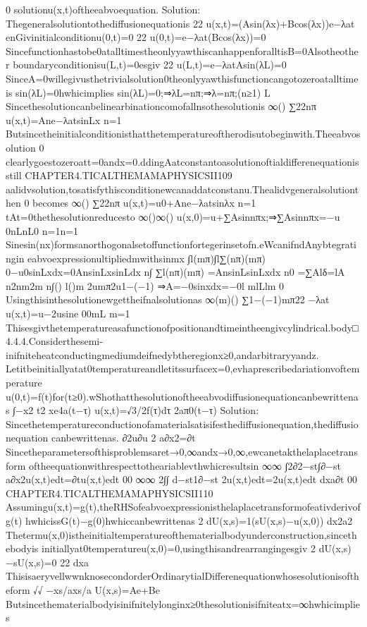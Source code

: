 {{{{0
solutionu(x,t)oftheeabvoequation.
Solution:
Thegeneralsolutiontothediffusionequationis
22
u(x,t)=(Asin(λx)+Bcos(λx))e−λat
enGivinitialconditionu(0,t)=0
22
u(0,t)=e−λat(Bcos(λx))=0
Sincefunctionhastobe0atalltimestheonlyyawthiscanhappenforalltisB=0Alsotheother
boundaryconditionisu(L,t)=0esgiv
22
u(L,t)=e−λatAsin(λL)=0
SinceA=0willegivusthetrivialsolution0theonlyyawthisfunctioncangotozeroatalltimeis
sin(λL)=0hwhicimplies
sin(λL)=0;⇒λL=nπ;⇒λ=nπ;(n≥1)
L
Sincethesolutioncanbelinearbinationcomofallnsothesolutionis
∞()
∑22nπ
u(x,t)=Ane−λatsinLx
n=1
Butsincetheinitialconditionisthatthetemperatureoftherodisutobeginwith.Theeabvosolution
0
clearlygoestozeroatt=0andx=0.ddingAatconstantoasolutionoftialdifferenequationisstill
CHAPTER4.TICALTHEMAMAPHYSICSII109
aalidvsolution,tosatisfythisconditionewcanaddatconstanu.Thealidvgeneralsolutionthen
0
becomes
∞()
∑22nπ
u(x,t)=u0+Ane−λatsinλx
n=1
tAt=0thethesolutionreducesto
∞()∞()
u(x,0)=u+∑Asinnπx;⇒∑Asinnπx=−u
0nLnL0
n=1n=1
Sinesin(nx)formsanorthogonalsetoffunctionfortegerinsetofn.eWcanifndAnybtegratingin
eabvoexpressionultipliedmwithsinmx
∫l(mπ)∫l∑(nπ)(mπ)
0−u0sinLxdx=0AnsinLxsinLdx
n∫
∑l(nπ)(mπ)
=AnsinLsinLxdx
n0
=∑Alδ=lA
n2nm2m
n∫()
l()m
2umπ2u1−(−1)
⇒A=−0sinxdx=−0l
mlLlm
0
Usingthisinthesolutionewgettheifnalsolutionas
∞(m)()
∑1−(−1)mπ22
−λat
u(x,t)=u−2usine
00mL
m=1
Thisesgivthetemperatureasafunctionofpositionandtimeintheengivcylindrical.body□
4.4.4.Considerthesemi-inifniteheatconductingmediumdeifnedybtheregionx≥0,andarbitraryyandz.
Letitbeinitiallyatat0temperatureandletitssurfacex=0,evhaprescribedariationvoftemperature
u(0,t)=f(t)for(t≥0).wShothatthesolutionoftheeabvodiffusionequationcanbewrittenas
∫−x2
t2
xe4a(t−τ)
u(x,t)=√3/2f(τ)dτ
2aπ0(t−τ)
Solution:
Sincethetemperatureconductionofamaterialsatisifesthediffusionequation,thediffusionequation
canbewrittenas.
∂2u∂u
2
a∂x2=∂t
Sincetheparametersofthisproblemsaret→{0,∞}andx→{0,∞},ewcanetakthelaplacetransform
oftheequationwithrespecttotheariablevthwhicresultsin
∞∞
∫2∂2−st∫∂−st
a∂x2u(x,t)edt=∂tu(x,t)edt
00
∞∞
2∫∫
d−st1∂−st
2u(x,t)edt=2u(x,t)edt
dxa∂t
00
CHAPTER4.TICALTHEMAMAPHYSICSII110
Assumingu(x,t)=g(t),theRHSofeabvoexpressionisthelaplacetransformofeativderivofg(t)
hwhicissG(t)−g(0)hwhiccanbewrittenas
2
dU(x,s)=1(sU(x,s)−u(x,0))
dx2a2
Thetermu(x,0)istheinitialtemperatureofthematerialbodyunderconstruction,sincethebodyis
initiallyat0temperatureu(x,0)=0,usingthisandrearrangingesgiv
2
dU(x,s)−sU(x,s)=0
22
dxa
ThisisaeryvellwwnknosecondorderOrdinarytialDifferenequationwhosesolutionisoftheform
√√
−xs/axs/a
U(x,s)=Ae+Be
Butsincethematerialbodyisinifnitelylonginx≥0thesolutionisifniteatx=∞hwhicimplies
}}}}
